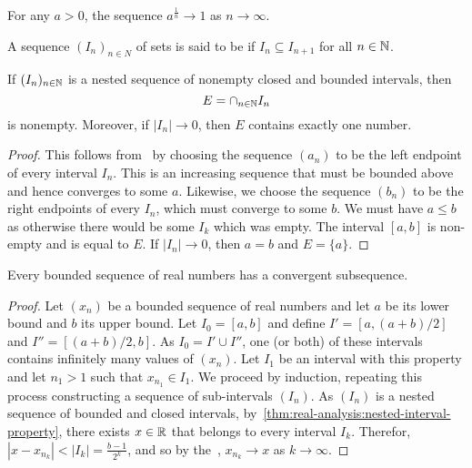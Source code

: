 \begin{example}
  For any \(a > 0\), the sequence \(a^{\frac 1 n} \to 1\) as \(n \to \infty\).
\end{example}

\begin{definition}
  A sequence \((I_{n})_{n \in N}\) of sets is said to be  if \(I_{n} \subseteq I_{n+1}\) for all \(n \in \mathbb{N}\).
\end{definition}

\begin{theorem}\label{thm:real-analysis:nested-interval-property}
  If \((I_{n})_{n \in \mathbb{N}}\) is a nested sequence of nonempty closed and bounded intervals, then
  \[E = \cap_{n \in \mathbb{N}} I_{n}\]
  is nonempty. Moreover, if \(|I_{n}| \to 0\), then \(E\) contains exactly one number.
\end{theorem}

\begin{proof}
  This follows from~ by choosing the sequence \((a_{n})\) to be the left endpoint of every interval \(I_{n}\). This is an increasing sequence that must be bounded above and hence converges to some \(a\). Likewise, we choose the sequence \((b_{n})\) to be the right endpoints of every \(I_{n}\), which must converge to some \(b\). We must have \(a \leq b\) as otherwise there would be some \(I_{k}\) which was empty. The interval \([a,b]\) is non-empty and is equal to \(E\). If \(|I_{n}| \to 0\), then \(a = b\) and \(E = \{a\}\).
\end{proof}

\begin{theorem}\label{thm:real-analysis:bolzano-weierstrass}
  Every bounded sequence of real numbers has a convergent subsequence.
\end{theorem}

\begin{proof}
  Let \((x_{n})\) be a bounded sequence of real numbers and let \(a\) be its lower bound and \(b\) its upper bound. Let \(I_{0} = [a,b]\) and define \(I' = [a, (a + b) / 2]\) and \(I'' = [(a + b) / 2, b]\). As \(I_{0} = I' \cup I''\), one (or both) of these intervals contains infinitely many values of \((x_{n})\). Let \(I_{1}\) be an interval with this property and let \(n_{1} > 1\) such that \(x_{n_{1}} \in I_{1}\). We proceed by induction, repeating this process constructing a sequence of sub-intervals \((I_{n})\). As \((I_{n})\) is a nested sequence of bounded and closed intervals, by~\ref{thm:real-analysis:nested-interval-property}, there exists \(x \in \mathbb{R}\) that belongs to every interval \(I_{k}\). Therefor, \(| x - x_{n_{k}} | < |I_{k}| = \frac{b-1}{2^{k}}\), and so by the~, \(x_{n_{k}} \to x\) as \(k \to \infty\).
\end{proof}

